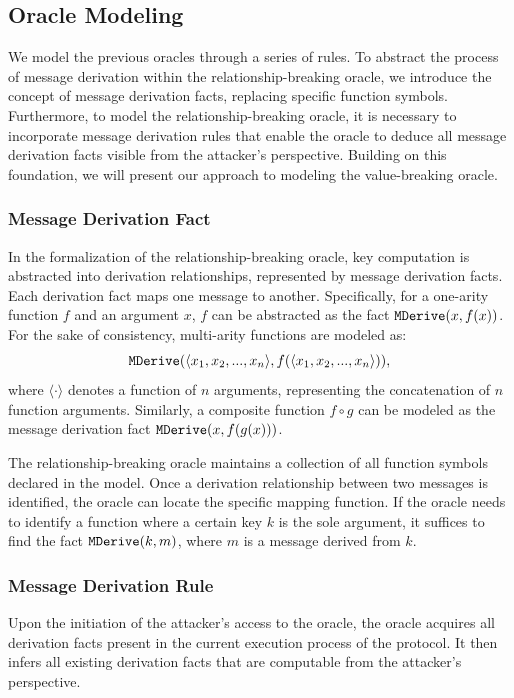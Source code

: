 \subsection{Oracle Modeling} \label{sec:oracle-modeling}

We model the previous oracles through a series of rules.
To abstract the process of message derivation within the relationship-breaking oracle, we introduce the concept of message derivation facts, replacing specific function symbols.
Furthermore, to model the relationship-breaking oracle, it is necessary to incorporate message derivation rules that enable the oracle to deduce all message derivation facts visible from the attacker's perspective.
Building on this foundation, we will present our approach to modeling the value-breaking oracle.

\subsubsection{Message Derivation Fact} In the formalization of the relationship-breaking oracle, key computation is abstracted into derivation relationships, represented by message derivation facts.
Each derivation fact maps one message to another.
Specifically, for a one-arity function $f$ and an argument $x$, $f$ can be abstracted as the fact $\text{{\ttfamily MDerive}}(x, f(x))$.
For the sake of consistency, multi-arity functions are modeled as:
\[
    \text{{\ttfamily MDerive}}(\langle x_1, x_2, ..., x_n \rangle, f(\langle x_1, x_2, ..., x_n \rangle)),
\]
where $\langle \cdot \rangle$ denotes a function of $n$ arguments, representing the concatenation of $n$ function arguments.
Similarly, a composite function $f \circ g$ can be modeled as the message derivation fact $\text{{\ttfamily MDerive}}(x, f(g(x)))$.

The relationship-breaking oracle maintains a collection of all function symbols declared in the
model.
Once a derivation relationship between two messages is identified, the oracle can locate the specific mapping function.
If the oracle needs to identify a function where a certain key $k$ is the sole argument, it suffices to find the fact $\text{{\ttfamily MDerive}}(k, m)$,
where $m$ is a message derived from $k$.

\subsubsection{Message Derivation Rule}  
Upon the initiation of the attacker's access to the oracle, the oracle acquires all derivation facts present in the current execution process of the protocol.
It then infers all existing derivation facts that are computable from the attacker's perspective.

